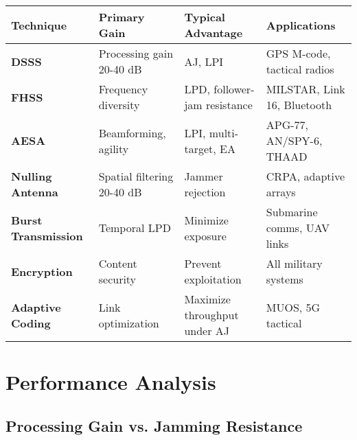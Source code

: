 {\def\LTcaptype{} %
\begin{longtable}[]{@{}
  >{\raggedright\arraybackslash}p{}
  >{\raggedright\arraybackslash}p{}
  >{\raggedright\arraybackslash}p{}
  >{\raggedright\arraybackslash}p{}@{}}
\toprule\noalign{}
\begin{minipage}[b]{\linewidth}\raggedright
Technique
\end{minipage} & \begin{minipage}[b]{\linewidth}\raggedright
Primary Gain
\end{minipage} & \begin{minipage}[b]{\linewidth}\raggedright
Typical Advantage
\end{minipage} & \begin{minipage}[b]{\linewidth}\raggedright
Applications
\end{minipage} \\
\midrule\noalign{}
\endhead
\bottomrule\noalign{}
\endlastfoot
\textbf{DSSS} & Processing gain 20-40 dB & AJ, LPI & GPS M-code,
tactical radios \\
\textbf{FHSS} & Frequency diversity & LPD, follower-jam resistance &
MILSTAR, Link 16, Bluetooth \\
\textbf{AESA} & Beamforming, agility & LPI, multi-target, EA & APG-77,
AN/SPY-6, THAAD \\
\textbf{Nulling Antenna} & Spatial filtering 20-40 dB & Jammer rejection
& CRPA, adaptive arrays \\
\textbf{Burst Transmission} & Temporal LPD & Minimize exposure &
Submarine comms, UAV links \\
\textbf{Encryption} & Content security & Prevent exploitation & All
military systems \\
\textbf{Adaptive Coding} & Link optimization & Maximize throughput under
AJ & MUOS, 5G tactical \\
\end{longtable}
}

\section{Performance Analysis}

\subsection{Processing Gain vs. Jamming Resistance}

